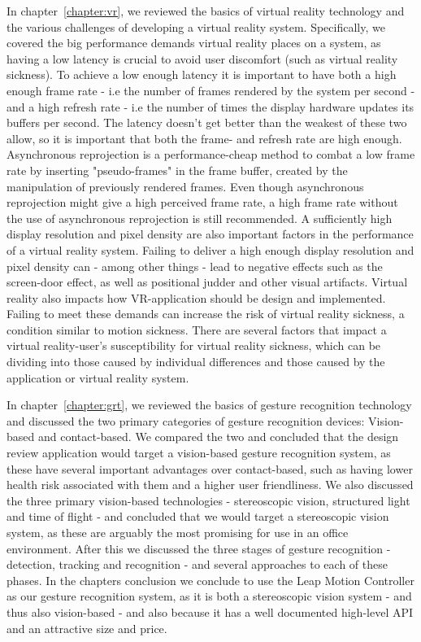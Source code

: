 In chapter~\ref{chapter:vr}, we reviewed the basics of virtual reality technology and the various challenges of developing a virtual reality system. 
Specifically, we covered the big performance demands virtual reality places on a system, as having a low latency is crucial to avoid user discomfort (such
as virtual reality sickness). To achieve a low enough latency it is important to have both a high enough frame rate - i.e the number of frames rendered by the system per second - 
and a high refresh rate - i.e the number of times the display hardware updates its buffers per second. The latency doesn't get better than the weakest of these two allow, so it is 
important that both the frame- and refresh rate are high enough. Asynchronous reprojection is a performance-cheap method to combat a low frame rate by inserting "pseudo-frames" in 
the frame buffer, created by the manipulation of previously rendered frames. 
Even though asynchronous reprojection might give a high perceived frame rate, a high frame rate without the use of asynchronous reprojection is still 
recommended. A sufficiently high display resolution and pixel density are also important factors in the performance of a virtual reality system. 
Failing to deliver a high enough display resolution and pixel density can - among other things - lead to negative effects such as the screen-door effect, 
as well as positional judder and other visual artifacts. 
Virtual reality also impacts how VR-application should be design and implemented. Failing to meet these demands can increase the 
risk of virtual reality sickness, a condition similar to motion sickness. There are several factors that impact a virtual reality-user's susceptibility for virtual 
reality sickness, which can be dividing into those caused by individual differences and those caused by the application or virtual reality system. 

In chapter~\ref{chapter:grt}, we reviewed the basics of gesture recognition technology and discussed the two primary categories of gesture recognition devices: Vision-based
and contact-based. We compared the two and concluded that the design review application would target a vision-based gesture recognition system, as these have several important
advantages over contact-based, such as having lower health risk associated with them and a higher user friendliness. We also discussed the three primary vision-based 
technologies - stereoscopic vision, structured light and time of flight - and concluded that we would target a stereoscopic vision system, as these are 
arguably the most promising for use in an office environment. After this we discussed the three stages of gesture recognition - detection, tracking and recognition - 
and several approaches to each of these phases. In the chapters conclusion we conclude to use the Leap Motion Controller as our gesture recognition system, 
as it is both a stereoscopic vision system - and thus also vision-based - and also because it has a well documented high-level API and an attractive size and price.

